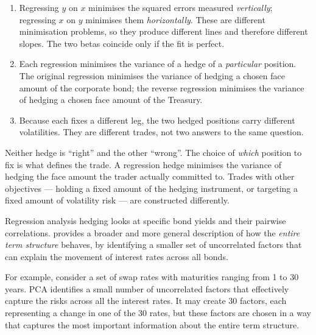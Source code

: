 \begin{mrkeybox}[title={Why the two differ}]
\begin{enumerate}
\item {} Regressing $y$ on $x$ minimises the squared errors
      measured \textit{vertically}; regressing $x$ on $y$ minimises them \textit{horizontally}.
      These are different minimisation problems, so they produce different lines and therefore
      different slopes. The two betas coincide only if the fit is perfect.
\item {} Each regression minimises the variance of a hedge
      of a \textit{particular} position. The original regression minimises the variance of
      hedging a chosen face amount of the corporate bond; the reverse regression minimises the
      variance of hedging a chosen face amount of the Treasury.
\item {} Because each fixes a different leg, the two
      hedged positions carry different volatilities. They are different trades, not two answers
      to the same question.
\end{enumerate}
\end{mrkeybox}

\begin{mrtrapbox}[title={The point to state out loud}]
Neither hedge is ``right'' and the other ``wrong''. The choice of \textit{which} position to fix
is what defines the trade. A regression hedge minimises the variance of hedging the face amount
the trader actually committed to. Trades with other objectives --- holding a fixed amount of the
hedging instrument, or targeting a fixed amount of volatility risk --- are constructed
differently.
\end{mrtrapbox}


Regression analysis hedging looks at specific bond yields and their pairwise correlations.
 provides a broader and more general description of how the
\textit{entire term structure} behaves, by identifying a smaller set of uncorrelated factors
that can explain the movement of interest rates across all bonds.

For example, consider a set of swap rates with maturities ranging from 1 to 30 years. PCA
identifies a small number of uncorrelated factors that effectively capture the risks across all
the interest rates. It may create 30 factors, each representing a change in one of the 30 rates,
but these factors are chosen in a way that captures the most important information about the
entire term structure.

